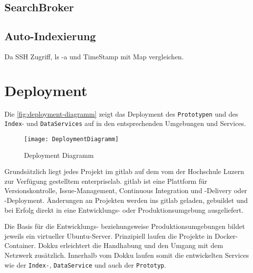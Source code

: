 
\subsection{SearchBroker}





\subsection{Auto-Indexierung} \label{auto-indexierung}


Da SSH Zugriff, ls -a und TimeStamp mit Map vergleichen.

    

\section{Deployment}



Die \autoref{fig:deployment-diagramm} zeigt das Deployment des \texttt{Prototypen} und des \texttt{Index}- und \texttt{DataServices} auf in den entsprechenden Umgebungen und Services.

    \begin{figure}[H]
    \centering
    \texttt{[image: DeploymentDiagramm]}
    \caption{Deployment Diagramm}
    \label{fig:deployment-diagramm}
    \end{figure}

Grundsätzlich liegt jedes Projekt im \gls{gitlab} auf dem vom der Hochschule Luzern zur Verfügung gestelltem \gls{enterpriselab}. \gls{gitlab} ist eine Plattform für Versionskontrolle, Issue-Management, Continuous Integration und -Delivery oder -Deployment. Änderungen an Projekten werden ins \gls{gitlab} geladen, gebuildet und bei Erfolg direkt in eine Entwicklungs- oder Produktionsumgebung ausgeliefert.

Die Basis für die Entwicklungs- beziehungsweise Produktionsumgebungen bildet jeweils ein virtueller \gls{Ubuntu}-Server.
Prinzipiell laufen die Projekte in \gls{Docker}-Container. \gls{Dokku} erleichtert die Handhabung und den Umgang mit dem Netzwerk zusätzlich. Innerhalb vom \gls{Dokku} laufen somit die entwickelten Services wie der \texttt{Index-}, \texttt{DataService} und auch der \texttt{Prototyp}. 

